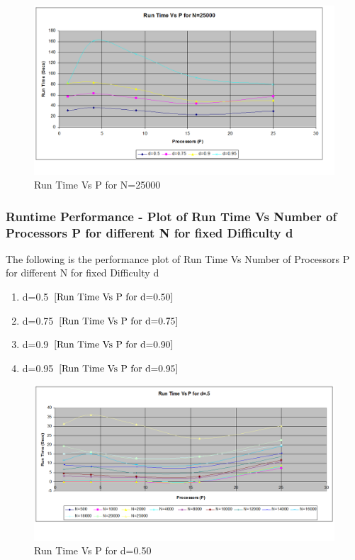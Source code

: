 \documentclass[twoside,11pt]{article}\usepackage{amsmath,amsfonts,amsthm,fullpage}
\begin{document}
\begin{figure}[!htbp]
\centering
\includegraphics[scale=.46]{charts/runtime_p_d_n_25000} 
\caption{Run Time Vs P for N=25000}
\label{Run Time Vs P for N=25000}
\end{figure}


\pagebreak
\subsubsection{Runtime Performance - Plot of Run Time Vs Number of Processors P for different N for fixed Difficulty d}
The following is the performance plot of Run Time Vs Number of Processors P for different N for fixed Difficulty d

\begin{enumerate}
\item
d=0.5 $\eqref{Run Time Vs P for d=0.50}$
\item
d=0.75 $\eqref{Run Time Vs P for d=0.75}$
\item
d=0.9 $\eqref{Run Time Vs P for d=0.90}$
\item
d=0.95 $\eqref{Run Time Vs P for d=0.95}$
\end{enumerate}

\begin{figure}[!htbp]
\centering
\includegraphics[scale=.46]{charts/runtime_p_n_d_50} 
\caption{Run Time Vs P for d=0.50}
\label{Run Time Vs P for d=0.50}
\end{figure}
\end{document}
